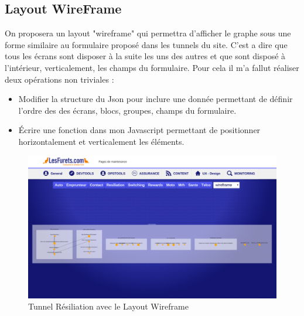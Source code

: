 \subsection{Layout WireFrame}
On proposera un layout "wireframe" qui permettra d'afficher le graphe sous une forme similaire au formulaire proposé dans les tunnels du site. C'est a dire que tous les écrans sont disposer à la suite les uns des autres et que sont disposé à l'intérieur, verticalement, les champs du formulaire. 
Pour cela il m'a fallut réaliser deux opérations non triviales : 
\begin{itemize}
\item 
Modifier la structure du Json pour inclure une donnée permettant de définir l'ordre des des écrans, blocs, groupes, champs du formulaire.
\item
Écrire une fonction dans mon Javascript permettant de positionner horizontalement et verticalement les éléments.
\end{itemize}
\vspace{0.5in}
\begin{figure}[!h]
\centering
\includegraphics[width=15cm]{outil/layout-wireframe.png}
\caption{Tunnel Résiliation avec le Layout Wireframe}
\end{figure}

\clearpage
